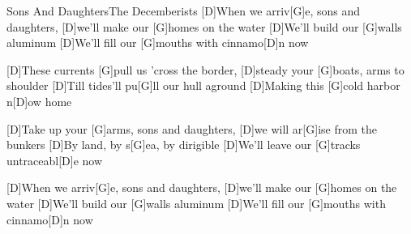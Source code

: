 \documentclass[../main.tex]{subfiles}
\begin{document}
\begin{song}{Sons And Daughters}{The Decemberists}{}
[D]When we arriv[G]e, sons and daughters, [D]we'll make our [G]homes on the water
[D]We'll build our [G]walls aluminum 
[D]We'll fill our [G]mouths with cinnamo[D]n now

[D]These currents [G]pull us 'cross the border, [D]steady your [G]boats, arms to shoulder
[D]Till tides'll pu[G]ll our hull aground
[D]Making this [G]cold harbor n[D]ow home

[D]Take up your [G]arms, sons and daughters, [D]we will ar[G]ise from the bunkers
[D]By land, by s[G]ea, by dirigible
[D]We'll leave our [G]tracks untraceabl[D]e now

[D]When we arriv[G]e, sons and daughters, [D]we'll make our [G]homes on the water
[D]We'll build our [G]walls aluminum
[D]We'll fill our [G]mouths with cinnamo[D]n now
\end{song}
\end{document}
